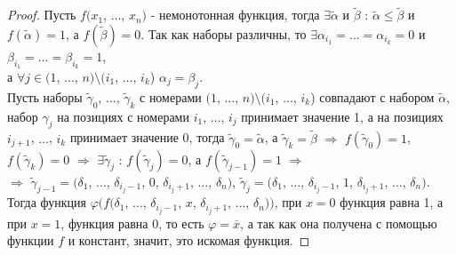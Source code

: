 \documentclass[a4paper, 12pt]{article}
\renewcommand{\phi}{\varphi}
\theoremstyle{definition}
\theoremstyle{plain}
\theoremstyle{remark}
\begin{document}
  \begin{proof}
    Пусть $f(x_1$, $\ldots$, $x_n)$ - немонотонная функция, тогда $\exists\tilde{\alpha}$ и $\tilde{\beta}$ : $\tilde{\alpha}\leqslant\tilde{\beta}$ и $f(\tilde{\alpha})=1$, а $f(\tilde{\beta})=0$. Так как наборы различны, то $\exists\alpha_{i_1}=\ldots=\alpha_{i_k}=0$ и $\beta_{i_1}=\ldots=\beta_{i_k}=1$,\\ а $\forall j\in(1$, $\ldots$, $n)\setminus(i_1$, $\ldots$, $i_k$) $\alpha_j=\beta_j$.\\ Пусть наборы $\tilde{\gamma}_0$, $\ldots$, $\tilde{\gamma}_k$ с номерами $(1$, $\ldots$, $n)\setminus(i_1$, $\ldots$, $i_k$) совпадают с набором $\tilde{\alpha}$, набор $\gamma_j$ на позициях с номерами $i_1$, $\ldots$, $i_j$ принимает значение 1, а на позициях $i_{j+1}$, $\ldots$, $i_k$ принимает значение 0, тогда $\tilde{\gamma}_0=\tilde{\alpha}$, а $\tilde{\gamma}_k=\tilde{\beta}$ $\Longrightarrow$ $f(\tilde{\gamma}_0)=1$, $f(\tilde{\gamma}_k)=0$ $\Longrightarrow$ $\exists\tilde{\gamma}_j$ : $f(\tilde{\gamma}_j)=0$, а $f(\tilde{\gamma}_{j-1})=1$ $\Longrightarrow$\\
    $\Longrightarrow$ $\tilde{\gamma}_{j-1}=(\delta_1$, $\ldots$, $\delta_{i_j-1}$, $0$, $\delta_{i_j+1}$, $\ldots$, $\delta_n)$, $\tilde{\gamma}_j=(\delta_1$, $\ldots$, $\delta_{i_j-1}$, $1$, $\delta_{i_j+1}$, $\ldots$, $\delta_n)$.\\
    Тогда функция $\phi(f(\delta_1$, $\ldots$, $\delta_{i_j-1}$, $x$, $\delta_{i_j+1}$, $\ldots$, $\delta_n))$, при $x=0$ функция равна 1, а при $x=1$, функция равна 0, то есть $\phi=\overline{x}$, а так как она получена с помощью функции $f$ и констант, значит, это искомая функция.
  \end{proof}
\end{document}
